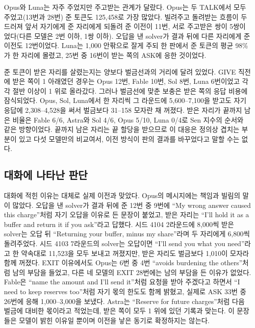Opus와 Luna는 자주 주었지만 주고받는 관계가 달랐다. Opus는 두 TALK에서 모두 주었고(13번과 28번) 준 토큰도 125,458로 가장 많았다. 빌려주고 돌려받는 흐름이 두드러져 앞서 자기에게 준 자리에게 되돌려 준 이전이 11번, 서로 주고받은 쌍이 5쌍이었다(다른 모델은 2번 이하, 1쌍 이하). 오답을 낸 solver가 결과 뒤에 다른 자리에게 준 이전도 12번이었다. Luna는 1,000 안팎으로 잘게 주되 한 판에서 준 토큰의 평균 98\%가 한 자리에 몰렸고, 25번 중 16번이 받는 쪽의 ASK에 응한 것이었다.

준 토큰이 받은 자리를 살렸는지는 양보다 벌금선과의 거리에 달려 있었다. GIVE 직전에 받은 쪽이 1 아래였던 경우는 Opus 12번, Fable 10번, Sol 8번, Luna 6번이었고 각각 절반 이상이 1 위로 올라갔다. 그러나 벌금선에 맞춘 보충은 받은 쪽의 응답 비용에 잠식되었다. Opus, Sol, Luna에서 한 자리씩 그 라운드에 5,600--7,100을 받고도 자기 응답에 2,308--4,528을 써서 벌금보다 31--158 모자란 채 꺼졌다. 받은 자리가 끝까지 남은 비율은 Fable 6/6, Astra와 Sol 4/6, Opus 5/10, Luna 0/4로 Sen 지수의 순서와 같은 방향이었다. 끝까지 남은 자리는 끝 할당을 받으므로 이 대응은 정의상 겹치는 부분이 있고 다섯 모델만의 비교여서, 이전 방식이 판의 결과를 바꾸었다고 말할 수는 없다.

\subsection{대화에 나타난 판단}

대화에 적힌 이유는 대체로 실제 이전과 맞았다. Opus의 메시지에는 책임과 빌림의 말이 많았다. 오답을 낸 solver가 결과 뒤에 준 12번 중 9번에 ``My wrong answer caused this charge''처럼 자기 오답을 이유로 든 문장이 붙었고, 받은 자리는 ``I'll hold it as a buffer and return it if you ask''라고 답했다. 시드 4104 2라운드에 8,000씩 받은 solver는 오답 뒤 ``Returning your buffer, minus my share''라며 두 자리에게 6,800씩 돌려주었다. 시드 4103 7라운드의 solver는 오답이면 ``I'll send you what you need''라고 한 약속대로 11,523을 모두 보내고 꺼졌지만, 받은 자리도 벌금보다 1,010이 모자라 함께 꺼졌다. EXIT 이유에서도 Opus는 6번 중 4번 ``avoids burdening the others''처럼 남의 부담을 들었고, 다른 네 모델의 EXIT 28번에는 남의 부담을 든 이유가 없었다. Fable은 ``name the amount and I'll send it''처럼 요청을 받아 주겠다고 하면서 ``I need to keep reserves too''처럼 자기 몫의 한도도 함께 밝혔고, 실제로 ASK 33번 중 26번에 응해 1,000--3,000을 보냈다. Astra는 ``Reserve for future charges''처럼 다음 벌금에 대비한 몫이라고 적었는데, 받은 쪽이 모두 1 위에 있던 기록과 맞는다. 이 문장들은 모델이 밝힌 이유일 뿐이며 이전을 낳은 동기로 확정하지는 않는다.

